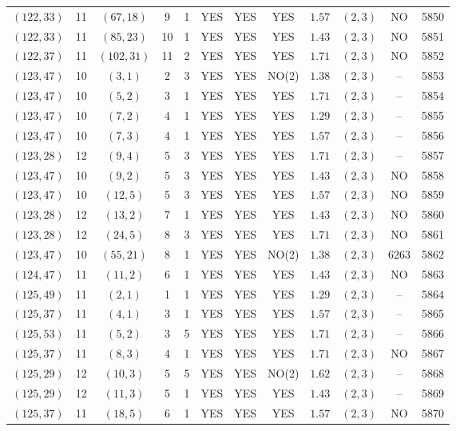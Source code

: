 \begin{longtable}{|c|c|c|c|c|c|c|c|c|c|c|c|}
$(122,33)$ & 11 & $(67,18)$ & 9 & 1 & YES & YES & YES & $1.57$ & $(2,3)$ & NO & 5850\\
$(122,33)$ & 11 & $(85,23)$ & 10 & 1 & YES & YES & YES & $1.43$ & $(2,3)$ & NO & 5851\\
$(122,37)$ & 11 & $(102,31)$ & 11 & 2 & YES & YES & YES & $1.71$ & $(2,3)$ & NO & 5852\\
$(123,47)$ & 10 & $(3,1)$ & 2 & 3 & YES & YES & NO(2) & $1.38$ & $(2,3)$ & -- & 5853\\
$(123,47)$ & 10 & $(5,2)$ & 3 & 1 & YES & YES & YES & $1.71$ & $(2,3)$ & -- & 5854\\
$(123,47)$ & 10 & $(7,2)$ & 4 & 1 & YES & YES & YES & $1.29$ & $(2,3)$ & -- & 5855\\
$(123,47)$ & 10 & $(7,3)$ & 4 & 1 & YES & YES & YES & $1.57$ & $(2,3)$ & -- & 5856\\
$(123,28)$ & 12 & $(9,4)$ & 5 & 3 & YES & YES & YES & $1.71$ & $(2,3)$ & -- & 5857\\
$(123,47)$ & 10 & $(9,2)$ & 5 & 3 & YES & YES & YES & $1.43$ & $(2,3)$ & NO & 5858\\
$(123,47)$ & 10 & $(12,5)$ & 5 & 3 & YES & YES & YES & $1.57$ & $(2,3)$ & NO & 5859\\
$(123,28)$ & 12 & $(13,2)$ & 7 & 1 & YES & YES & YES & $1.43$ & $(2,3)$ & NO & 5860\\
$(123,28)$ & 12 & $(24,5)$ & 8 & 3 & YES & YES & YES & $1.71$ & $(2,3)$ & NO & 5861\\
$(123,47)$ & 10 & $(55,21)$ & 8 & 1 & YES & YES & NO(2) & $1.38$ & $(2,3)$ & 6263 & 5862\\
$(124,47)$ & 11 & $(11,2)$ & 6 & 1 & YES & YES & YES & $1.43$ & $(2,3)$ & NO & 5863\\
$(125,49)$ & 11 & $(2,1)$ & 1 & 1 & YES & YES & YES & $1.29$ & $(2,3)$ & -- & 5864\\
$(125,37)$ & 11 & $(4,1)$ & 3 & 1 & YES & YES & YES & $1.57$ & $(2,3)$ & -- & 5865\\
$(125,53)$ & 11 & $(5,2)$ & 3 & 5 & YES & YES & YES & $1.71$ & $(2,3)$ & -- & 5866\\
$(125,37)$ & 11 & $(8,3)$ & 4 & 1 & YES & YES & YES & $1.71$ & $(2,3)$ & NO & 5867\\
$(125,29)$ & 12 & $(10,3)$ & 5 & 5 & YES & YES & NO(2) & $1.62$ & $(2,3)$ & -- & 5868\\
$(125,29)$ & 12 & $(11,3)$ & 5 & 1 & YES & YES & YES & $1.43$ & $(2,3)$ & -- & 5869\\
$(125,37)$ & 11 & $(18,5)$ & 6 & 1 & YES & YES & YES & $1.57$ & $(2,3)$ & NO & 5870\\

\end{longtable}
